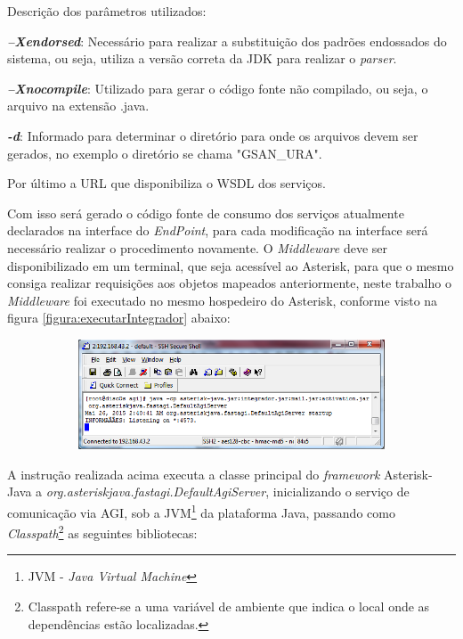 Descrição dos parâmetros utilizados:

\begin{description}
	\item \textbf{\textit{–Xendorsed}}: Necessário para realizar a substituição dos padrões endossados do sistema, ou seja, utiliza a versão correta da JDK para realizar o \textit{parser}.
	\item \textbf{\textit{–Xnocompile}}: Utilizado para gerar o código fonte não compilado, ou seja, o arquivo na extensão .java.
	\item \textbf{\textit{-d}}: Informado para determinar o diretório para onde os arquivos devem ser gerados, no exemplo o diretório se chama "GSAN\_URA".
	\item Por último a URL que disponibiliza o WSDL dos serviços. 
\end{description}



Com isso será gerado o código fonte de consumo dos serviços atualmente declarados na interface do \textit{EndPoint}, para cada modificação na interface será necessário realizar o procedimento novamente. O \textit{Middleware} deve ser disponibilizado em um terminal, que seja acessível ao Asterisk, para que o mesmo consiga realizar requisições aos objetos mapeados anteriormente, neste trabalho o \textit{Middleware} foi executado no mesmo hospedeiro do Asterisk, conforme visto na figura \ref{figura:executarIntegrador} abaixo:

\begin{figure}[H]
	\centering
	\caption{Executando o sistema Integrador.}	
	\label{figura:executarIntegrador}
	\begin{subfigure}[H]{\textwidth}
		\centering
		\includegraphics{figuras/executar_integrador.png}
	\end{subfigure}
\end{figure}


A instrução realizada acima executa a classe principal do \textit{framework} Asterisk-Java a \textit{ org.asteriskjava.fastagi.DefaultAgiServer}, inicializando o serviço de comunicação via AGI, sob a JVM\footnote{JVM - \textit{Java Virtual Machine}} da plataforma Java, passando como \textit{Classpath}\footnote{Classpath refere-se a uma variável de ambiente que indica o local onde as dependências estão localizadas.} as seguintes bibliotecas: 

